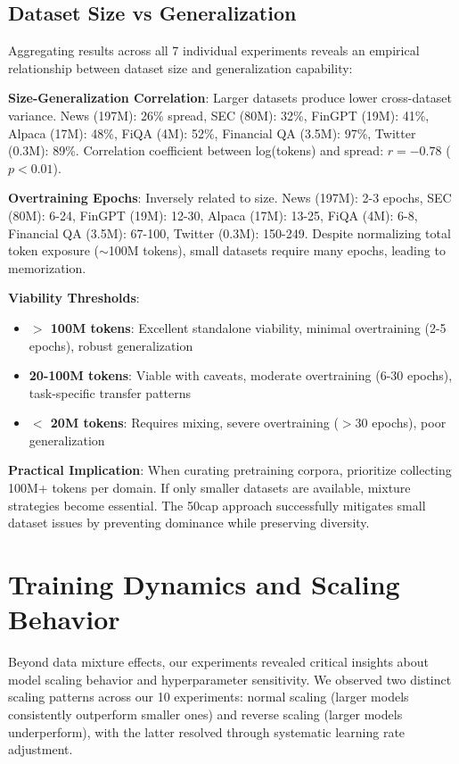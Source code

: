 \subsection{Dataset Size vs Generalization}

Aggregating results across all 7 individual experiments reveals an empirical relationship between dataset size and generalization capability:

\textbf{Size-Generalization Correlation}: Larger datasets produce lower cross-dataset variance. News (197M): 26\% spread, SEC (80M): 32\%, FinGPT (19M): 41\%, Alpaca (17M): 48\%, FiQA (4M): 52\%, Financial QA (3.5M): 97\%, Twitter (0.3M): 89\%. Correlation coefficient between log(tokens) and spread: $r = -0.78$ ($p < 0.01$).

\textbf{Overtraining Epochs}: Inversely related to size. News (197M): 2-3 epochs, SEC (80M): 6-24, FinGPT (19M): 12-30, Alpaca (17M): 13-25, FiQA (4M): 6-8, Financial QA (3.5M): 67-100, Twitter (0.3M): 150-249. Despite normalizing total token exposure ($\sim$100M tokens), small datasets require many epochs, leading to memorization.

\textbf{Viability Thresholds}:
\begin{itemize}
\item \textbf{$>$ 100M tokens}: Excellent standalone viability, minimal overtraining (2-5 epochs), robust generalization
\item \textbf{20-100M tokens}: Viable with caveats, moderate overtraining (6-30 epochs), task-specific transfer patterns
\item \textbf{$<$ 20M tokens}: Requires mixing, severe overtraining ($>$30 epochs), poor generalization
\end{itemize}

\textbf{Practical Implication}: When curating pretraining corpora, prioritize collecting 100M+ tokens per domain. If only smaller datasets are available, mixture strategies become essential. The 50cap approach successfully mitigates small dataset issues by preventing dominance while preserving diversity.

\section{Training Dynamics and Scaling Behavior}

Beyond data mixture effects, our experiments revealed critical insights about model scaling behavior and hyperparameter sensitivity. We observed two distinct scaling patterns across our 10 experiments: normal scaling (larger models consistently outperform smaller ones) and reverse scaling (larger models underperform), with the latter resolved through systematic learning rate adjustment.

